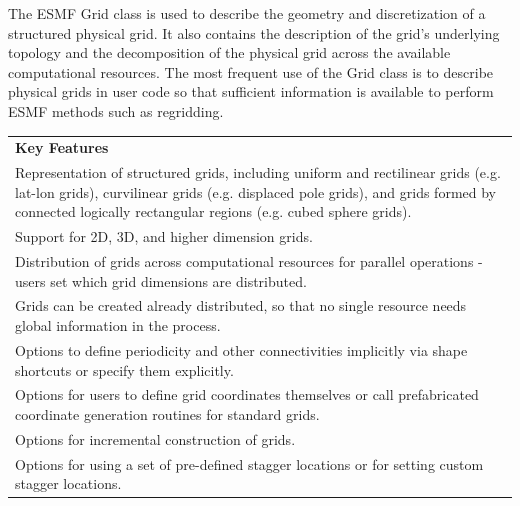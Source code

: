%

The ESMF Grid class is used to describe the geometry and discretization
of a structured physical grid.  It also contains the description of the
grid's underlying topology and the decomposition of the physical grid
across the available computational resources.  The most frequent 
use of the Grid class is to describe physical grids in user
code so that sufficient information is available to perform ESMF
methods such as regridding.  

\begin{center}
\begin{tabular}{|p{6in}|}
\hline
\vspace{.01in}
{\bf Key Features} \\[.01in]
Representation of structured grids, including uniform and
rectilinear grids (e.g. lat-lon grids), curvilinear grids (e.g. displaced pole grids), 
and grids formed by connected logically rectangular regions (e.g. cubed
sphere grids).\\
Support for 2D, 3D, and higher dimension grids.\\ 
Distribution of grids across computational resources for parallel
operations - users set which grid dimensions are distributed.\\
Grids can be created already distributed, so that no single
resource needs global information in the process.\\
Options to define periodicity and other connectivities implicitly via
shape shortcuts or specify them explicitly.\\ 
Options for users to define grid coordinates themselves or call
prefabricated coordinate generation routines for standard grids.\\
Options for incremental construction of grids.\\
Options for using a set of pre-defined stagger locations or for setting
custom stagger locations.\\ [.03in] \hline
\end{tabular}
\end{center}

